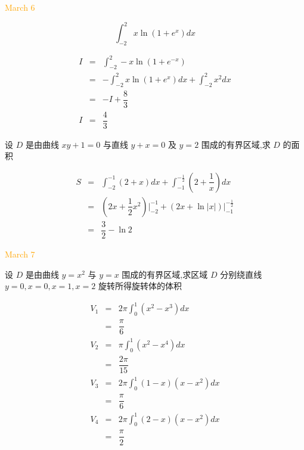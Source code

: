 \textcolor{orange}{March 6}

\begin{example}[][Exam: 29.1.11]
	$$\int_{-2}^{2}x\ln(1+e^{x})dx$$
\end{example}
\begin{solution}
	\begin{eqnarray*}
		I & = & \int_{-2}^{2}-x\ln(1+e^{-x})\\
		  & = & -\int_{-2}^{2}x\ln(1+e^{x})dx + \int_{-2}^{2}x^{2}dx\\
		  & = & -I + \dfrac{8}{3}\\
		I & = & \dfrac{4}{3} 
	\end{eqnarray*}
\end{solution}
\begin{example}[][Exam: 29.1.12]
	设 $D$ 是由曲线 $xy+1=0$ 与直线 $y+x=0$ 及 $y=2$ 围成的有界区域,求 $D$ 的面积
\end{example}
\begin{solution}
	\begin{eqnarray*}
		S & = & \int_{-2}^{-1}(2+x)dx + \int_{-1}^{-\frac{1}{2}}(2 + \dfrac{1}{x})dx\\
		  & = & (2x + \dfrac{1}{2}x^{2})\big|_{-2}^{-1} + (2x + \ln|x|)\big|_{-1}^{-\frac{1}{2}}\\
		  & = & \dfrac{3}{2} - \ln 2
	\end{eqnarray*}
\end{solution}

\textcolor{orange}{March 7}

\begin{example}[][Exam: 29.1.13]
	设 $D$ 是由曲线 $y=x^{2}$ 与 $y=x$ 围成的有界区域,求区域 $D$ 分别绕直线 $y=0,x=0,x=1,x=2$ 旋转所得旋转体的体积
\end{example}
\begin{solution}
	\begin{eqnarray*}
		V_{1} & = & 2\pi \int_{0}^{1}(x^{2}-x^{3})dx\\
			  & = & \dfrac{\pi}{6}\\
		V_{2} & = & \pi\int_{0}^{1}(x^{2}-x^{4})dx\\
			  & = & \dfrac{2\pi}{15}\\
		V_{3} & = & 2\pi\int_{0}^{1}(1-x)(x-x^{2})dx\\
			  & = & \dfrac{\pi}{6}\\
		V_{4} & = & 2\pi\int_{0}^{1}(2-x)(x-x^{2})dx\\
			  & = & \dfrac{\pi}{2}
	\end{eqnarray*}
\end{solution}

